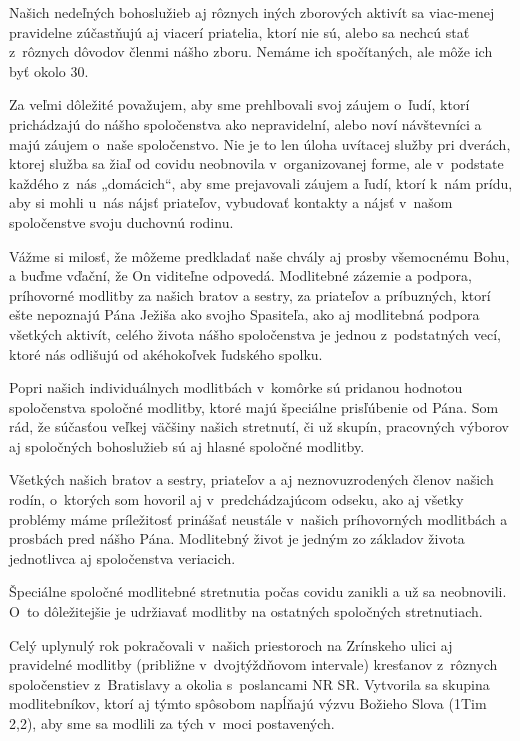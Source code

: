 Našich nedeľných bohoslužieb aj rôznych iných zborových aktivít sa viac-menej pravidelne zúčastňujú aj viacerí priatelia, ktorí nie sú, alebo sa nechcú stať z~rôznych dôvodov členmi nášho zboru. Nemáme ich spočítaných, ale môže ich byť okolo 30.

Za veľmi dôležité považujem, aby sme prehlbovali svoj záujem o~ľudí, ktorí prichádzajú do nášho spoločenstva ako nepravidelní, alebo noví návštevníci a majú záujem o~naše spoločenstvo. Nie je to len úloha uvítacej služby pri dverách, ktorej služba sa žiaľ od covidu neobnovila v~organizovanej forme, ale v~podstate každého z~nás „domácich“, aby sme prejavovali záujem a ľudí, ktorí k~nám prídu, aby si mohli u~nás nájsť priateľov, vybudovať kontakty a nájsť v~našom spoločenstve svoju duchovnú rodinu.


Vážme si milosť, že môžeme predkladať naše chvály aj prosby všemocnému Bohu, a buďme vďační, že On viditeľne odpovedá. Modlitebné zázemie a podpora, príhovorné modlitby za našich bratov a sestry, za priateľov a príbuzných, ktorí ešte nepoznajú Pána Ježiša ako svojho Spasiteľa, ako aj modlitebná podpora všetkých aktivít, celého života nášho spoločenstva je jednou z~podstatných vecí, ktoré nás odlišujú od akéhokoľvek ľudského spolku.

Popri našich individuálnych modlitbách v~komôrke sú pridanou hodnotou spoločenstva spoločné modlitby, ktoré majú špeciálne prisľúbenie od Pána. Som rád, že súčasťou veľkej väčšiny našich stretnutí, či už skupín, pracovných výborov aj spoločných bohoslužieb sú aj hlasné spoločné modlitby.

Všetkých našich bratov a sestry, priateľov a aj neznovuzrodených členov našich rodín, o~ktorých som hovoril aj v~predchádzajúcom odseku, ako aj všetky problémy máme príležitosť prinášať neustále v~našich príhovorných modlitbách a prosbách pred nášho Pána. Modlitebný život je jedným zo základov života jednotlivca aj spoločenstva veriacich.

Špeciálne spoločné modlitebné stretnutia počas covidu zanikli a už sa neobnovili. O~to dôležitejšie je udržiavať modlitby na ostatných spoločných stretnutiach.

Celý uplynulý rok pokračovali v~našich priestoroch na Zrínskeho ulici aj pravidelné modlitby (približne v~dvojtýždňovom intervale) kresťanov z~rôznych spoločenstiev z~Bratislavy a okolia s~poslancami NR SR. Vytvorila sa skupina modlitebníkov, ktorí aj týmto spôsobom napĺňajú výzvu Božieho Slova (1Tim 2,2), aby sme sa modlili za tých v~moci postavených.

